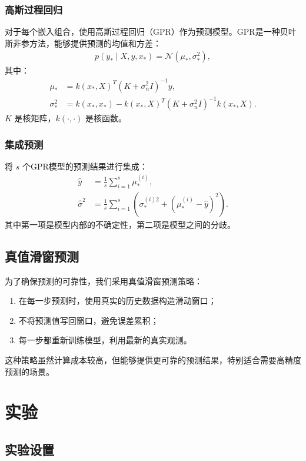 \documentclass[12pt,a4paper]{article}
\begin{document}
\subsubsection{高斯过程回归}
对于每个嵌入组合，使用高斯过程回归（GPR）作为预测模型。GPR是一种贝叶斯非参方法，能够提供预测的均值和方差：
\begin{align}
p(y_*\mid X,y,x_*)=\mathcal{N}(\mu_*,\sigma_*^2),
\end{align}
其中：
\begin{align}
\mu_* &= k(x_*,X)^T (K+\sigma_n^2 I)^{-1} y,\\
\sigma_*^2 &= k(x_*,x_*) - k(x_*,X)^T (K+\sigma_n^2 I)^{-1} k(x_*,X).
\end{align}
$K$ 是核矩阵，$k(\cdot,\cdot)$ 是核函数。

\subsubsection{集成预测}
将 $s$ 个GPR模型的预测结果进行集成：
\begin{align}
\hat{y} &= \frac{1}{s}\sum_{i=1}^s \mu_*^{(i)},\\
\hat{\sigma}^2 &= \frac{1}{s}\sum_{i=1}^s \left(\sigma_*^{(i)2}+(\mu_*^{(i)}-\hat{y})^2\right).
\end{align}
其中第一项是模型内部的不确定性，第二项是模型之间的分歧。

\subsection{真值滑窗预测}

为了确保预测的可靠性，我们采用真值滑窗预测策略：
\begin{enumerate}
    \item 在每一步预测时，使用真实的历史数据构造滑动窗口；
    \item 不将预测值写回窗口，避免误差累积；
    \item 每一步都重新训练模型，利用最新的真实观测。
\end{enumerate}

这种策略虽然计算成本较高，但能够提供更可靠的预测结果，特别适合需要高精度预测的场景。

\section{实验}

\subsection{实验设置}
\end{document}
